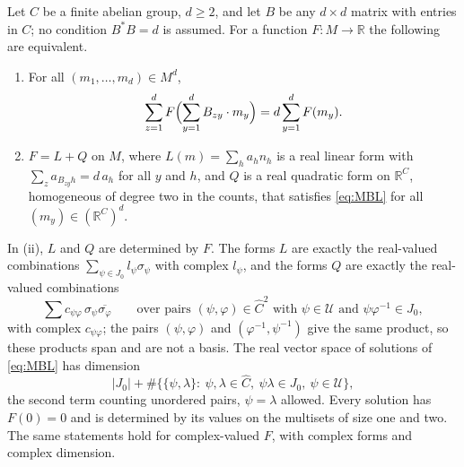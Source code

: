 \begin{theorem}\label{thm:multiset}
Let $C$ be a finite abelian group, $d\ge2$, and let $B$ be any $d\times d$ matrix with entries in $C$; no condition $B^*B=d$ is assumed. For a function $F\colon M\to\mathbb{R}$ the following are equivalent.
\begin{enumerate}
\item[(i)] For all $(m_1,\dots,m_d)\in M^d$,
\begin{equation}\label{eq:MBL}
\sum_{z=1}^dF\Bigl(\sum_{y=1}^dB_{zy}\cdot m_y\Bigr)=d\sum_{y=1}^dF(m_y).
\end{equation}
\item[(ii)] $F=L+Q$ on $M$, where $L(m)=\sum_ha_hn_h$ is a real linear form with $\sum_za_{B_{zy}h}=d\,a_h$ for all $y$ and $h$, and $Q$ is a real quadratic form on $\mathbb{R}^C$, homogeneous of degree two in the counts, that satisfies \eqref{eq:MBL} for all $(m_y)\in(\mathbb{R}^C)^d$.
\end{enumerate}
In (ii), $L$ and $Q$ are determined by $F$. The forms $L$ are exactly the real-valued combinations $\sum_{\psi\in J_0}l_\psi\sigma_\psi$ with complex $l_\psi$, and the forms $Q$ are exactly the real-valued combinations
\[
\sum c_{\psi\varphi}\,\sigma_\psi\overline{\sigma_\varphi}\qquad\text{over pairs }(\psi,\varphi)\in\hat C^2\text{ with }\psi\in \mathcal{U}\text{ and }\psi\varphi^{-1}\in J_0,
\]
with complex $c_{\psi\varphi}$; the pairs $(\psi,\varphi)$ and $(\varphi^{-1},\psi^{-1})$ give the same product, so these products span and are not a basis. The real vector space of solutions of \eqref{eq:MBL} has dimension
\[
|J_0|+\#\bigl\{\{\psi,\lambda\}:\ \psi,\lambda\in\hat C,\ \psi\lambda\in J_0,\ \psi\in \mathcal{U}\bigr\},
\]
the second term counting unordered pairs, $\psi=\lambda$ allowed. Every solution has $F(0)=0$ and is determined by its values on the multisets of size one and two. The same statements hold for complex-valued $F$, with complex forms and complex dimension.
\end{theorem}

